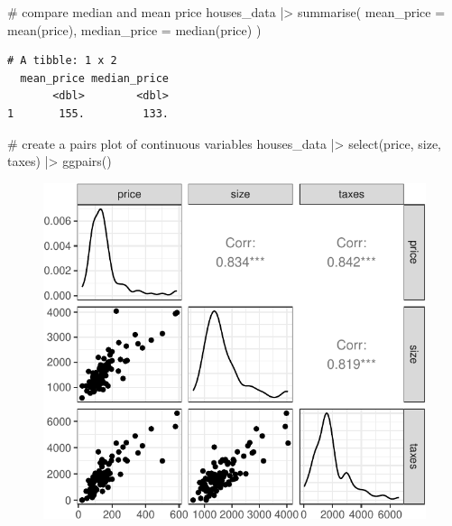 \documentclass[
  11pt,
  letterpaper,
  oneside]{book}
\newenvironment{Shaded}{\begin{snugshade}}{\end{snugshade}}
\newcommand{\AttributeTok}[1]{\textcolor[rgb]{0.40,0.45,0.13}{#1}}
\newcommand{\CommentTok}[1]{\textcolor[rgb]{0.37,0.37,0.37}{#1}}
\newcommand{\FunctionTok}[1]{\textcolor[rgb]{0.28,0.35,0.67}{#1}}
\newcommand{\NormalTok}[1]{\textcolor[rgb]{0.00,0.23,0.31}{#1}}
\newcommand{\SpecialCharTok}[1]{\textcolor[rgb]{0.37,0.37,0.37}{#1}}
\theoremstyle{plain}
\theoremstyle{plain}
\theoremstyle{definition}
\theoremstyle{definition}
\theoremstyle{plain}
\theoremstyle{remark}
\begin{document}
\begin{Shaded}
\begin{Highlighting}[]
\CommentTok{\# compare median and mean price}
\NormalTok{houses\_data }\SpecialCharTok{|\textgreater{}}
  \FunctionTok{summarise}\NormalTok{(}
    \AttributeTok{mean\_price =} \FunctionTok{mean}\NormalTok{(price),}
    \AttributeTok{median\_price =} \FunctionTok{median}\NormalTok{(price)}
\NormalTok{  )}
\end{Highlighting}
\end{Shaded}

\begin{verbatim}
# A tibble: 1 x 2
  mean_price median_price
       <dbl>        <dbl>
1       155.         133.
\end{verbatim}

\begin{Shaded}
\begin{Highlighting}[]
\CommentTok{\# create a pairs plot of continuous variables}
\NormalTok{houses\_data }\SpecialCharTok{|\textgreater{}}
  \FunctionTok{select}\NormalTok{(price, size, taxes) }\SpecialCharTok{|\textgreater{}}
  \FunctionTok{ggpairs}\NormalTok{()}
\end{Highlighting}
\end{Shaded}

\begin{figure}[H]

{\centering \includegraphics{r-demo-part-2_files/figure-pdf/unnamed-chunk-5-1.pdf}

}

\end{figure}
\end{document}
